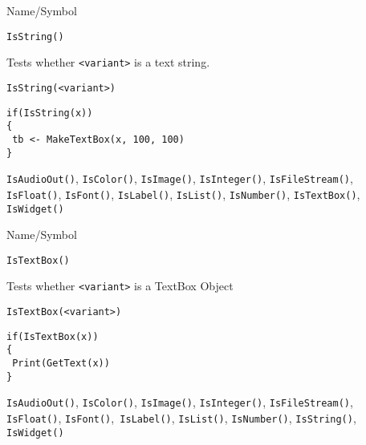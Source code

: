 \begin{desc}{Name/Symbol}
\item[Name/Symbol]	\verb+IsString()+

\item[Description]	Tests whether \verb+<variant>+ is a text string.

\item[Usage]		
\begin{verbatim}
IsString(<variant>)
\end{verbatim}

\item[Example]	
\begin{verbatim}
if(IsString(x))
{
 tb <- MakeTextBox(x, 100, 100)
}
\end{verbatim}

\item[See Also]	\verb+IsAudioOut()+, \verb+IsColor()+, \verb+IsImage()+, \verb+IsInteger()+, 
		\verb+IsFileStream()+, \verb+IsFloat()+, \verb+IsFont()+, \verb+IsLabel()+,
		\verb+IsList()+, \verb+IsNumber()+, \verb+IsTextBox()+, \verb+IsWidget()+
\end{desc}

\rl




\begin{desc}{Name/Symbol}
\item[Name/Symbol]	\verb+IsTextBox()+

\item[Description]	Tests whether \verb+<variant>+ is a TextBox Object

\item[Usage]
\begin{verbatim}
IsTextBox(<variant>)
\end{verbatim}

\item[Example]	
\begin{verbatim}
if(IsTextBox(x))
{
 Print(GetText(x))
}
\end{verbatim}

\item[See Also] \verb+IsAudioOut()+, \verb+IsColor()+,
  \verb+IsImage()+, \verb+IsInteger()+, \verb+IsFileStream()+,
  \verb+IsFloat()+, \verb+IsFont()+,\verb+ IsLabel()+,
  \verb+IsList()+, \verb+IsNumber()+, \verb+IsString()+,
  \verb+IsWidget()+
\end{desc}

\rl



